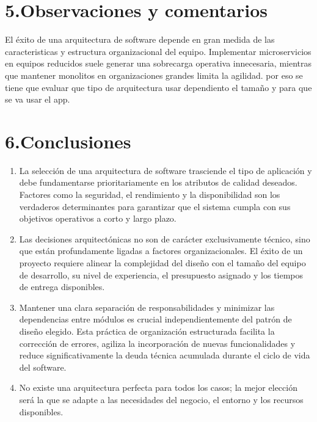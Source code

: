 \documentclass[12pt,letterpaper]{article}
\begin{document}
\vspace{1em}

\section*{5.Observaciones y comentarios}
El éxito de una arquitectura de software depende en gran medida de las caracteristicas y estructura organizacional del equipo. Implementar microservicios en equipos reducidos suele generar una sobrecarga operativa innecesaria, mientras que mantener monolitos en organizaciones grandes limita la agilidad. por eso se tiene que evaluar que tipo de arquitectura usar dependiento el tamaño y para que se va usar el app.


\vspace{1em}

\section*{6.Conclusiones}
\begin{enumerate}
    \item La selección de una arquitectura de software trasciende el tipo de aplicación y debe fundamentarse prioritariamente en los atributos de calidad deseados. Factores como la seguridad, el rendimiento y la disponibilidad son los verdaderos determinantes para garantizar que el sistema cumpla con sus objetivos operativos a corto y largo plazo.
    
    \item Las decisiones arquitectónicas no son de carácter exclusivamente técnico, sino que están profundamente ligadas a factores organizacionales. El éxito de un proyecto requiere alinear la complejidad del diseño con el tamaño del equipo de desarrollo, su nivel de experiencia, el presupuesto asignado y los tiempos de entrega disponibles.
    
    \item Mantener una clara separación de responsabilidades y minimizar las dependencias entre módulos es crucial independientemente del patrón de diseño elegido. Esta práctica de organización estructurada facilita la corrección de errores, agiliza la incorporación de nuevas funcionalidades y reduce significativamente la deuda técnica acumulada durante el ciclo de vida del software.
    
    \item No existe una arquitectura perfecta para todos los casos; la mejor elección será la que se adapte a las necesidades del negocio, el entorno y los recursos disponibles.
\end{enumerate}
\vspace{1em}
\end{document}
